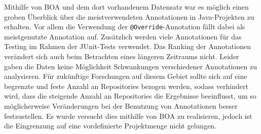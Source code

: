\documentclass[11pt,a4paper,parskip=full]{scrartcl}
\begin{document}
Mithilfe von BOA und dem dort vorhandenem Datensatz war es möglich einen groben Überblick über die meistverwendeten Annotationen in Java-Projekten zu erhalten. Vor allem die Verwendung der \texttt{@Override}-Annotation fällt dabei als meistgenutzte  Annotation auf. Zusätzlich werden viele Annotationen für das Testing im Rahmen der JUnit-Tests verwendet. Das Ranking der Annotationen verändert sich auch beim Betrachten eines längeren Zeitraums nicht. Leider gaben die Daten keine Möglichkeit Schwankungen verschiedener Annotationen zu analysieren. Für zukünftige Forschungen auf diesem Gebiet sollte sich auf eine begrenzte und feste Anzahl an Repositories bezogen werden, sodass verhindert wird, dass die steigende Anzahl an Repositories die Ergebnisse beeinflusst, um so möglicherweise Veränderungen bei der Benutzung von Annotationen besser festzustellen. Es wurde versucht dies mithilfe von BOA zu realisieren, jedoch ist die Eingrenzung auf eine vordefinierte Projektmenge nicht gelungen.


\printbibliography
\end{document}
